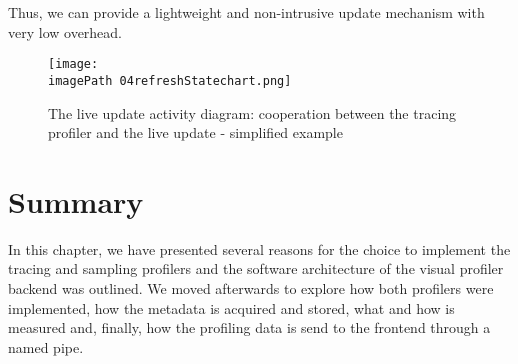 Thus, we can provide a lightweight and non-intrusive update mechanism with very low overhead. 

\begin{figure}
	\centering
		\texttt{[image: \\imagePath 04refreshStatechart.png]}
		\caption{The live update activity diagram: cooperation between the tracing profiler and the live update  - simplified example }
	\label{fig:04refreshStatechart}
\end{figure}

 
\section{Summary}
In this chapter, we have presented several reasons for the choice to implement the tracing and sampling profilers and the software architecture of the visual profiler backend was outlined. We moved afterwards to explore how both profilers were implemented, how the metadata is acquired and stored, what and how is measured and, finally, how the profiling data is send to the frontend through a named pipe.







